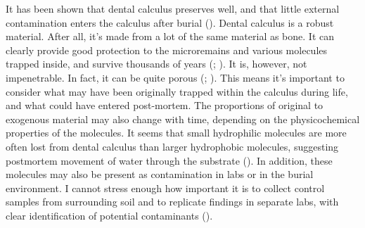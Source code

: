 \documentclass[
  b5paper,
]{book}
\begin{document}
It has been shown that dental calculus preserves well, and that little
external contamination enters the calculus after burial
(). Dental calculus is a robust material. After all, it's made from
a lot of the same material as bone. It can clearly provide good
protection to the microremains and various molecules trapped inside, and
survive thousands of years
(;
). It is,
however, not impenetrable. In fact, it can be quite porous
(; ). This means it's important to consider what may have been
originally trapped within the calculus during life, and what could have
entered post-mortem. The proportions of original to exogenous material
may also change with time, depending on the physicochemical properties
of the molecules. It seems that small hydrophilic molecules are more
often lost from dental calculus than larger hydrophobic molecules,
suggesting postmortem movement of water through the substrate
(). In
addition, these molecules may also be present as contamination in labs
or in the burial environment. I cannot stress enough how important it is
to collect control samples from surrounding soil and to replicate
findings in separate labs, with clear identification of potential
contaminants
().
\end{document}
